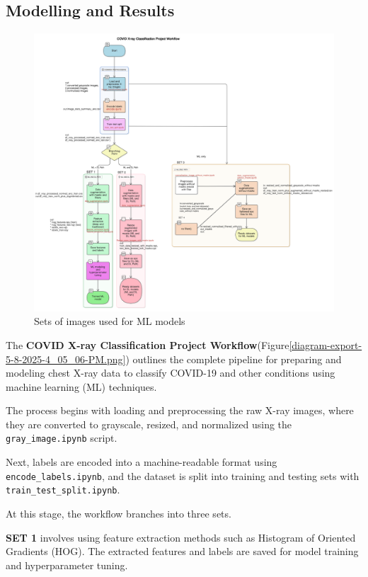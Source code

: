 \documentclass{article}
\begin{document}
\subsection{Modelling and Results}
\begin{figure}%
    \centering
    \includegraphics[width=1.0\linewidth]{diagram-export-5-8-2025-4_05_06-PM.png}
    \caption{Sets of images used for ML models}
    \label{fig:WORKFLOW}
\end{figure}
The \textbf{COVID X-ray Classification Project Workflow}(Figure\ref{diagram-export-5-8-2025-4_05_06-PM.png}) outlines the complete pipeline for preparing and modeling chest X-ray data to classify COVID-19 and other conditions using machine learning (ML) techniques.

The process begins with loading and preprocessing the raw X-ray images, where they are converted to grayscale, resized, and normalized using the \texttt{gray\_image.ipynb} script.

Next, labels are encoded into a machine-readable format using \texttt{encode\_labels.ipynb}, and the dataset is split into training and testing sets with \texttt{train\_test\_split.ipynb}.

At this stage, the workflow branches into three sets.

\textbf{SET 1} involves using feature extraction methods such as Histogram of Oriented Gradients (HOG). The extracted features and labels are saved for model training and hyperparameter tuning.
\end{document}
